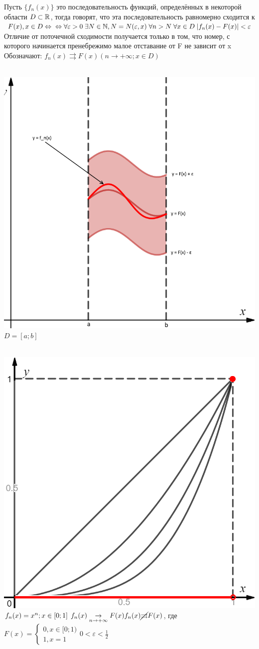 \begin{Def}
	Пусть $\{f_n(x)\}$ это последовательность функций, определённых в некоторой области $D \subset \mathbb{R}$, тогда говорят, что эта последовательность равномерно сходится к $F(x), x \in D \Leftrightarrow \\
	\Leftrightarrow \forall \varepsilon > 0 \; \exists N \in \mathbb{N}, N=N(\varepsilon, x) \; \forall n > N \; \forall x \in D \; |f_n(x) - F(x)| < \varepsilon$
	Отличие от поточечной сходимости получается только в том, что номер, с которого начинается пренебрежимо малое отставание от F не зависит от x\\
	Обозначают: $f_n(x) \rightrightarrows F(x) (n \to +\infty; x \in D)$
\end{Def}

\begin{Note}
	~\\
	\includegraphics[width=0.5\linewidth]{4_1_3.png} $D = [a;b]$
\end{Note}

\begin{Note}
	~\\
	\includegraphics[width=0.5\linewidth]{4_1_4.png}\\
	$f_n(x) = x^n; x \in [0;1] \: \: f_n(x) \underset{n \to +\infty}{\rightarrow}F(x) \\
	f_n(x) \cancel{\rightrightarrows} F(x)$, где $F(x) = 
	\begin{cases}
	0, x \in [0;1)\\
	1, x = 1
	\end{cases} 0 < \varepsilon < \frac{1}{2}$
\end{Note}

